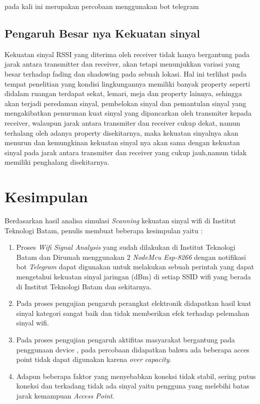 \documentclass[conference]{IEEEtran}
\begin{document}
    pada kali ini merupakan percobaan menggunakan bot telegram

\subsection{Pengaruh Besar nya Kekuatan sinyal}



Kekuatan sinyal RSSI yang diterima oleh
receiver tidak hanya bergantung pada jarak
antara transmitter dan receiver, akan tetapi
menunjukkan variasi yang besar terhadap fading
dan shadowing pada sebuah lokasi. Hal ini
terlihat pada tempat penelitian yang kondisi
lingkungannya memiliki banyak property seperti
didalam ruangan terdapat sekat, lemari, meja dan
property lainnya, sehingga akan terjadi peredaman sinyal, 
pembelokan sinyal dan pemantulan
sinyal yang mengakibatkan penurunan kuat
sinyal yang dipancarkan oleh transmiter kepada
receiver, walaupun jarak antara transmiter dan
receiver cukup dekat, namun terhalang oleh
adanya property disekitarnya, maka kekuatan
sinyalnya akan menurun dan kemungkinan
kekuatan sinyal nya akan sama dengan kekuatan
sinyal pada jarak antara transmiter dan receiver
yang cukup jauh,namun tidak memiliki
penghalang disekitarnya.

\section{Kesimpulan}

Berdasarkan hasil analisa simulasi \textit{Scanning} kekuatan sinyal wifi di Institut Teknologi Batam, penulis membuat beberapa kesimpulan yaitu :
\begin{enumerate}
    \item Proses \textit{Wifi Signal Analysis} yang sudah dilakukan di Institut Teknologi Batam dan Dirumah  menggunakan 2 \textit{NodeMcu Esp-8266} dengan notifikasi bot \textit{Telegram} dapat digunakan untuk melakukan sebuah perintah yang dapat mengetahui kekuatan sinyal jaringan (dBm)
    di setiap SSID wifi yang berada di Institut Teknologi Batam dan sekitarnya.
    \item Pada proses pengujian pengaruh perangkat elektronik didapatkan hasil kuat sinyal kategori sangat baik dan tidak memberikan efek terhadap pelemahan sinyal wifi.
    \item Pada proses pengujian pengaruh aktifitas masyarakat bergantung pada penggunaan device , pada percobaan didapatkan bahwa ada beberapa acces point tidak dapat digunakan karena \textit{over capacity}.
   \item Adapun beberapa faktor yang menyebabkan koneksi tidak stabil, sering putus koneksi dan terkadang tidak ada sinyal yaitu pengguna yang melebihi batas jarak kemampuan \textit{Access Point}.
\end{enumerate}

% 
% 
\end{document}
